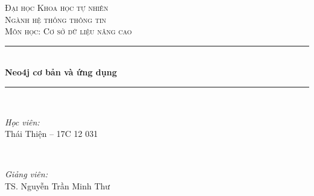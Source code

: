 \begin{titlepage}

\newcommand{\HRule}{\rule{\linewidth}{0.5mm}} %

\center %
 

\textsc{\LARGE Đại học Khoa học tự nhiên}\\[1.5cm] %
\textsc{\Large Ngành hệ thống thông tin}\\[0.5cm] %
\textsc{\large Môn học: Cơ sở dữ liệu nâng cao}\\[0.5cm] %


\HRule \\[0.4cm]
{ \huge \bfseries Neo4j cơ bản và ứng dụng}\\[0.4cm] %
\HRule \\[1.5cm]
 

\begin{minipage}{0.4\textwidth}
\begin{flushleft} \large
\emph{Học viên:}\\
Thái Thiện -- 17C 12 031 %
\end{flushleft}
\end{minipage}
~
\begin{minipage}{0.4\textwidth}
\begin{flushright} \large
\emph{Giảng viên:} \\
TS. Nguyễn Trần Minh Thư %
\end{flushright}
\end{minipage}\\[2cm]



\end{titlepage}
